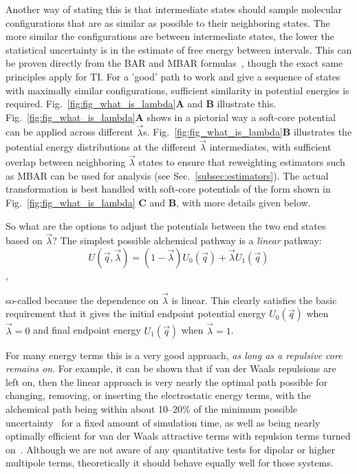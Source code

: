 \documentclass[9pt,bestpractices]{livecoms}
\begin{document}
Another way of stating this is that intermediate states should sample molecular configurations that are as similar as possible to their neighboring states. The more similar the configurations are between intermediate states, the lower the statistical uncertainty is in the estimate of free energy between intervals. This can be proven directly from the BAR and MBAR formulas~\cite{bennett1976efficient,klimovich2015guidelines}, though the exact same principles apply for TI. For a 'good' path to work and give a sequence of states with maximally similar configurations, sufficient similarity in potential energies is required. Fig.~\ref{fig:fig_what_is_lambda}\textbf{A} and \textbf{B} illustrate this. Fig.~\ref{fig:fig_what_is_lambda}\textbf{A} shows in a pictorial way a soft-core potential can be applied across different $\vec{\lambda}$s. Fig.~\ref{fig:fig_what_is_lambda}\textbf{B} illustrates the potential energy distributions at the different $\vec{\lambda}$ intermediates, with sufficient overlap between neighboring $\vec{\lambda}$ states to ensure that reweighting estimators such as MBAR can be used for analysis (see Sec.~\ref{subsec:estimators}). The actual transformation is best handled with soft-core potentials of the form shown in Fig.~\ref{fig:fig_what_is_lambda} \textbf{C} and \textbf{B}, with more details given below. 

So what are the options to adjust the potentials between the two end states based on $\vec{\lambda}$? The simplest possible alchemical pathway is a \textit{linear} pathway:
\begin{equation}
U(\vec{q},\vec{\lambda}) = (1-\vec{\lambda}) U_0(\vec{q}) + \vec{\lambda}U_1(\vec{q}) \end{equation},

so-called because the dependence on $\vec{\lambda}$ is linear. This clearly satisfies the basic requirement that it gives the initial endpoint potential energy $U_0(\vec{q})$ when $\vec{\lambda}=0$ and final endpoint energy $U_1(\vec{q})$ when $\vec{\lambda}=1$. 

For many energy terms this is a very good approach, \textit{as long as a repulsive core remains on}. For example, it can be shown that if van der Waals repulsions are left on, then the linear approach is very nearly the optimal path possible for changing, removing, or inserting the electrostatic energy terms, with the alchemical path being within about 10--20\% of the minimum possible uncertainty~\cite{naden2015linear} for a fixed amount of simulation time, as well as being nearly optimally efficient for van der Waals attractive terms with repulsion terms turned on~\cite{naden2014linear}. Although we are not aware of any quantitative tests for dipolar or higher multipole terms, theoretically it should behave equally well for those systems.
\end{document}
